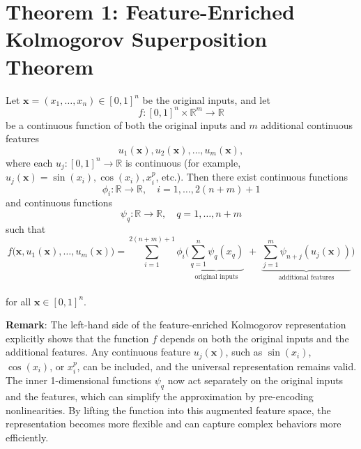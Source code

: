 \documentclass{article}
\begin{document}
\appendix
\section{Theorem 1: Feature-Enriched Kolmogorov Superposition Theorem}
\label{AppenA}

Let \(\mathbf{x} = (x_1, \dots, x_n) \in [0,1]^n\) be the original inputs, and let
\[
f: [0,1]^n \times \mathbb{R}^m \to \mathbb{R}
\] 
be a continuous function of both the original inputs and \(m\) additional continuous features
\[
u_1(\mathbf{x}), u_2(\mathbf{x}), \dots, u_m(\mathbf{x}),
\]
where each \(u_j: [0,1]^n \to \mathbb{R}\) is continuous (for example, \(u_j(\mathbf{x}) = \sin(x_i), \cos(x_i), x_i^p\), etc.). Then there exist continuous functions
\[
\phi_i: \mathbb{R} \to \mathbb{R}, \quad i = 1, \dots, 2(n+m)+1
\]
and continuous functions
\[
\psi_q: \mathbb{R} \to \mathbb{R}, \quad q = 1, \dots, n+m
\]
such that
\begin{equation}
\label{eq:kolmogorov-features-explicit}
\boxed{
f\big(\mathbf{x}, u_1(\mathbf{x}), \dots, u_m(\mathbf{x})\big) 
= \sum_{i=1}^{2(n+m)+1} 
\phi_i \Bigg(
\underbrace{\sum_{q=1}^{n} \psi_q(x_q)}_{\text{original inputs}} \;+\; 
\underbrace{\sum_{j=1}^{m} \psi_{n+j}(u_j(\mathbf{x}))}_{\text{additional features}}
\Bigg)
}
\end{equation}
\\
for all \(\mathbf{x} \in [0,1]^n\).
\vspace{0.2cm}

\noindent \textbf{Remark}: The left-hand side of the feature-enriched Kolmogorov representation explicitly shows that the function \(f\) depends on both the original inputs and the additional features. Any continuous feature \(u_j(\mathbf{x})\), such as \(\sin(x_i)\), \(\cos(x_i)\), or \(x_i^p\), can be included, and the universal representation remains valid. The inner 1-dimensional functions \(\psi_q\) now act separately on the original inputs and the features, which can simplify the approximation by pre-encoding nonlinearities. By lifting the function into this augmented feature space, the representation becomes more flexible and can capture complex behaviors more efficiently.
\end{document}
